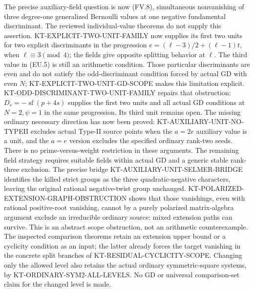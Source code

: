 The precise auxiliary-field question is now (FV.8), simultaneous
nonvanishing of three degree-one generalized Bernoulli values
at one negative fundamental discriminant. The reviewed
individual-value theorems do not supply this assertion.
KT-EXPLICIT-TWO-UNIT-FAMILY now supplies its first two
units for two explicit discriminants in the progression
$e=(\ell-3)/2+(\ell-1)t$, when $\ell\equiv3\pmod4$;
the fields give opposite splitting behavior at $\ell$.
The third value in (EU.5) is still an arithmetic condition.
Those particular discriminants are even and do not satisfy
the odd-discriminant condition forced by actual GD with even
$N$; KT-EXPLICIT-TWO-UNIT-GD-SCOPE makes this limitation explicit.
KT-ODD-DISCRIMINANT-TWO-UNIT-FAMILY repairs that obstruction:
$D_s=-\operatorname{sf}(p+4s)$ supplies the first two units
and all actual GD conditions at $N=2,\psi=1$ in the same
progression. Its third unit remains open.
The missing ordinary necessary direction has now been proved:
KT-AUXILIARY-UNIT-NO-TYPEII excludes actual Type-II source points
when the $a=2e$ auxiliary value is a unit, and the $a=e$ version
excludes the specified ordinary rank-two seeds. There is no
prime-versus-weight restriction in these arguments.
The remaining field strategy requires suitable fields within
actual GD and a generic stable rank-three exclusion.
The precise bridge KT-AUXILIARY-UNIT-SELMER-BRIDGE identifies
the killed strict groups as the three quadratic-negative
characters, leaving the original rational negative-twist
group unchanged. KT-POLARIZED-EXTENSION-GRAPH-OBSTRUCTION
shows that those vanishings, even with rational positive-root
vanishing, cannot by a purely polarized matrix-algebra argument
exclude an irreducible ordinary source: mixed extension paths
can survive. This is an abstract scope obstruction, not an
arithmetic counterexample. The inspected comparison theorems
retain an extension upper bound or a cyclicity condition as an
input; the latter already forces the target vanishing in the
concrete split branches of KT-RESIDUAL-CYCLICITY-SCOPE.
Changing only the allowed level also retains the actual
ordinary symmetric-square systems, by
KT-ORDINARY-SYM2-ALL-LEVELS. No GD or universal comparison-set
claim for the changed level is made.

